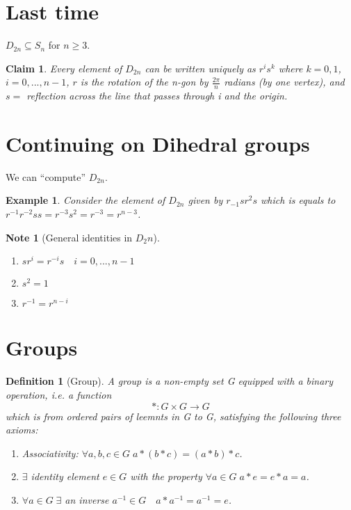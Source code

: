 \documentclass[11pt, oneside]{book}
\theoremstyle{break}
\newtheorem{claim}{Claim}[section]
\newtheorem*{note}{Note}
\newtheorem{defn}{Definition}[section]
\newtheorem{eg}{Example}[section]
\begin{document}
\section{Last time}

$D_{2n} \subseteq S_n$ for $n \geq 3$.

\begin{claim}
    Every element of $D_{2n}$ can be written uniquely as $r^i s^k$ where $k = 0, 1$, $i = 0, ..., n - 1$, $r$ is the rotation of the n-gon by $\frac{2\pi}{n}$ radians (by one vertex), and $s =$ reflection across the line that passes through i and the origin.
\end{claim}

\section{Continuing on Dihedral groups}

We can ``compute'' $D_{2n}$.

\begin{eg}
    Consider the element of $D_{2n}$ given by $r_{-1}sr^2s$ which is equals to $r^{-1}r^{-2}ss = r^{-3}s^2 = r^{-3} = r^{n - 3}$.
\end{eg}

\begin{note}[General identities in $D_2n$]
    \begin{enumerate}
        \item $sr^i = r^{-i}s \quad i = 0, ..., n - 1$
        \item $s^2 = 1$
        \item $r^{-1} = r^{n - i}$
    \end{enumerate}
\end{note}

\section{Groups}\label{sect:group_intro}

\begin{defn}[Group]
    A group is a non-empty set G equipped with a binary operation, i.e. a function
    \begin{equation}
        * : G \times G \to G
    \end{equation}
    which is from ordered pairs of leemnts in G to G, satisfying the following three axioms:
    \begin{enumerate}
        \item Associativity: $\forall a, b, c \in G \; a * (b * c) = (a * b) * c$.
        \item $\exists$ identity element $e \in G$ with the property $\forall a \in G \; a * e = e * a = a$.
        \item $\forall a \in G \; \exists $ an inverse $a^{-1} \in G \quad a * a^{-1} = a^{-1} = e$.
    \end{enumerate}
\end{defn}
\end{document}
